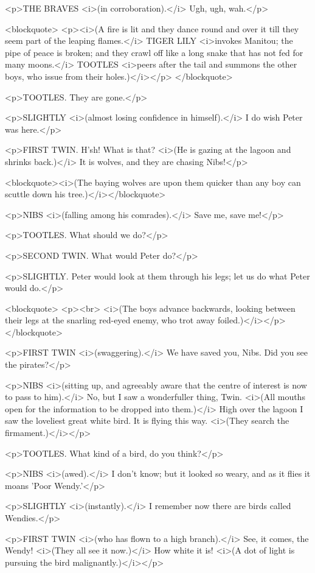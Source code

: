 <p>THE BRAVES <i>(in corroboration).</i> Ugh, ugh, wah.</p>

<blockquote> <p><i>(A fire is lit and they dance round and over it till they seem part of the leaping flames.</i> TIGER LILY <i>invokes Manitou; the pipe of peace is broken; and they crawl off like a long snake that has not fed for many moons.</i> TOOTLES <i>peers after the tail and summons the other boys, who issue from their holes.)</i></p> </blockquote>

<p>TOOTLES. They are gone.</p>

<p>SLIGHTLY <i>(almost losing confidence in himself).</i> I do wish Peter was here.</p>

<p>FIRST TWIN. H'sh! What is that? <i>(He is gazing at the lagoon and shrinks back.)</i> It is wolves, and they are chasing Nibs!</p>

<blockquote><i>(The baying wolves are upon them quicker than any boy can scuttle down his tree.)</i></blockquote>

<p>NIBS <i>(falling among his comrades).</i> Save me, save me!</p>

<p>TOOTLES. What should we do?</p>

<p>SECOND TWIN. What would Peter do?</p>

<p>SLIGHTLY. Peter would look at them through his legs; let us do what Peter would do.</p>

<blockquote> <p><br> <i>(The boys advance backwards, looking between their legs at the snarling red-eyed enemy, who trot away foiled.)</i></p> </blockquote>

<p>FIRST TWIN <i>(swaggering).</i> We have saved you, Nibs. Did you see the pirates?</p>

<p>NIBS <i>(sitting up, and agreeably aware that the centre of interest is now to pass to him).</i> No, but I saw a wonderfuller thing, Twin. <i>(All mouths open for the information to be dropped into them.)</i> High over the lagoon I saw the loveliest great white bird. It is flying this way. <i>(They search the firmament.)</i></p>

<p>TOOTLES. What kind of a bird, do you think?</p>

<p>NIBS <i>(awed).</i> I don't know; but it looked so weary, and as it flies it moans 'Poor Wendy.'</p>

<p>SLIGHTLY <i>(instantly).</i> I remember now there are birds called Wendies.</p>

<p>FIRST TWIN <i>(who has flown to a high branch).</i> See, it comes, the Wendy! <i>(They all see it now.)</i> How white it is! <i>(A dot of light is pursuing the bird malignantly.)</i></p>

